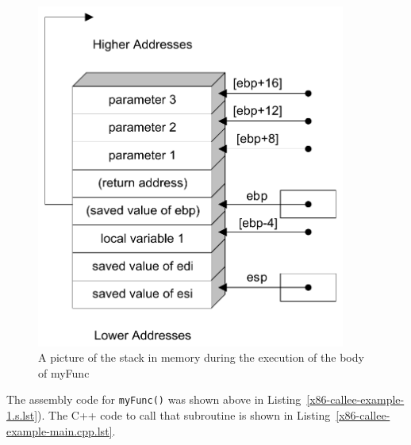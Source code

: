 \begin{figure}[h]
\centering
\includegraphics[width=4in]{x86-32bit/x86-activation-record.pdf}
\caption{A picture of the stack in memory during the execution of the body of myFunc}
\label{x86-activation-record.fig}
\end{figure}

The assembly code for {\tt myFunc()} was shown above in
Listing~\ref{x86-callee-example-1.s.lst}). The C++ code to call that
subroutine is shown in
Listing~\ref{x86-callee-example-main.cpp.lst}.

\begin{figure}[h!]

\end{figure}




